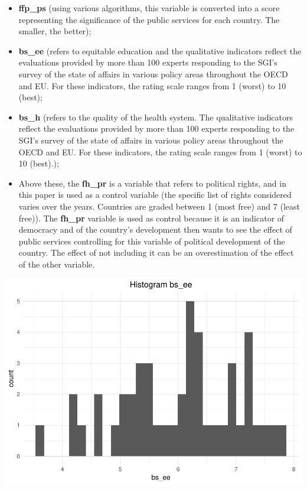 \documentclass[]{elsarticle} %
\makeatletter
\providecommand{\tightlist}{%
  \setlength{\itemsep}{0pt}\setlength{\parskip}{0pt}}
\def\maxwidth{\ifdim\Gin@nat@width>\linewidth\linewidth
\else\Gin@nat@width\fi}
\let\Oldincludegraphics\includegraphics
\renewcommand{\includegraphics}[1]{\Oldincludegraphics[width=\maxwidth]{#1}}
\makeatother
\begin{document}
\begin{itemize}
\tightlist
\item
  \textbf{ffp\_ps} (using various algorithms, this variable is converted
  into a score representing the significance of the public services for
  each country. The smaller, the better);
\item
  \textbf{bs\_ee} (refers to equitable education and the qualitative
  indicators reflect the evaluations provided by more than 100 experts
  responding to the SGI's survey of the state of affairs in various
  policy areas throughout the OECD and EU. For these indicators, the
  rating scale ranges from 1 (worst) to 10 (best);
\item
  \textbf{bs\_h} (refers to the quality of the health system. The
  qualitative indicators reflect the evaluations provided by more than
  100 experts responding to the SGI's survey of the state of affairs in
  various policy areas throughout the OECD and EU. For these indicators,
  the rating scale ranges from 1 (worst) to 10 (best).);
\item
  Above these, the \textbf{fh\_pr} is a variable that refers to
  political rights, and in this paper is used as a control variable (the
  specific list of rights considered varies over the years. Countries
  are graded between 1 (most free) and 7 (least free)). The
  \textbf{fh\_pr} variable is used as control because it is an indicator
  of democracy and of the country's development then wants to see the
  effect of public services controlling for this variable of political
  development of the country. The effect of not including it can be an
  overestimation of the effect of the other variable.
\end{itemize}

\includegraphics{stephanie-moura-rmarkdown-tf-ad-ufpe-2018_files/figure-latex/ggplot_variables1-1.pdf}
\end{document}
